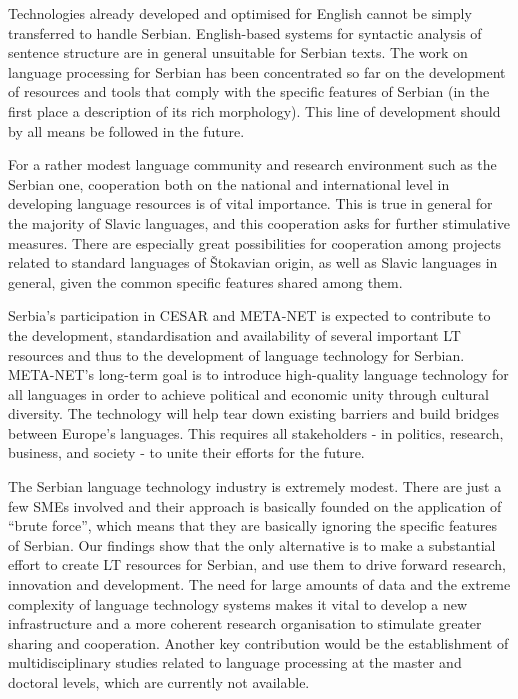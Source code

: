 {\begin{multicols}{2}
Technologies already developed and optimised for English cannot be simply transferred to handle Serbian. English-based systems for syntactic analysis of sentence structure are in general unsuitable for Serbian texts. The work on language processing for Serbian has been concentrated so far on the development of resources and tools that comply with the specific features of Serbian (in the first place a description of its rich morphology). This line of development should by all means be followed in the future. 

For a rather modest language community and research environment such as the Serbian one, cooperation both on the national and international level in developing language resources is of vital importance. This is true in general for the majority of Slavic languages, and this cooperation asks for further stimulative measures. There are especially great possibilities for cooperation among projects related to standard languages of Štokavian origin, as well as Slavic languages in general, given the common specific features shared among them. 

Serbia’s participation in CESAR and META-NET is expected to contribute to the development, standardisation and availability of several important LT resources and thus to the development of language technology for Serbian. META-NET’s long-term goal is to introduce high-quality language technology for all languages in order to achieve political and economic unity through cultural diversity. The technology will help tear down existing barriers and build bridges between Europe’s languages. This requires all stakeholders - in politics, research, business, and society - to unite their efforts for the future.

The Serbian language technology industry is extremely modest. There are just a few SMEs involved and their approach is basically founded on the application of “brute force”, which means that they are basically ignoring the specific features of Serbian. Our findings show that the only alternative is to make a substantial effort to create LT resources for Serbian, and use them to drive forward research, innovation and development. The need for large amounts of data and the extreme complexity of language technology systems makes it vital to develop a new infrastructure and a more coherent research organisation to stimulate greater sharing and cooperation. Another key contribution would be the establishment of multidisciplinary studies related to language processing at the master and doctoral levels, which are currently not available.


\end{multicols}}
